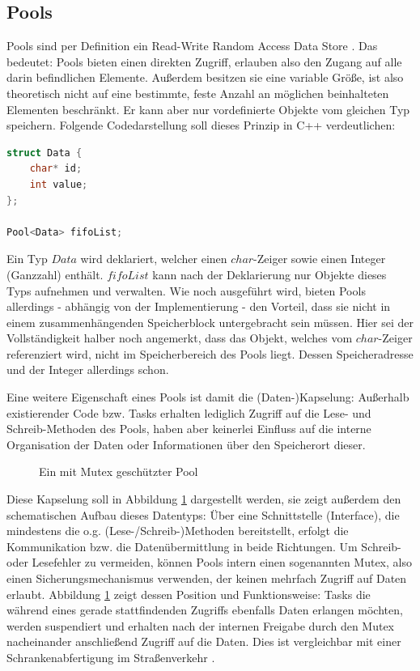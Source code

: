\documentclass{llncs}
\begin{document}
\subsection{Pools}
\label{subsec:Pools}
Pools sind per Definition ein \glqq Read-Write Random Access Data Store\grqq{} \autocite[94]{Cooling2017}. Das bedeutet: Pools bieten einen direkten Zugriff, erlauben also den Zugang auf alle darin befindlichen Elemente. Außerdem besitzen sie eine variable Größe, ist also theoretisch nicht auf eine bestimmte, feste Anzahl an möglichen beinhalteten Elementen beschränkt. Er kann aber nur vordefinierte Objekte vom gleichen Typ speichern. Folgende Codedarstellung soll dieses Prinzip in C++ verdeutlichen:
\begin{lstlisting}[language=C++]
struct Data {
	char* id;
	int value;
};

Pool<Data> fifoList;
\end{lstlisting}
Ein Typ $Data$ wird deklariert, welcher einen $char$-Zeiger sowie einen Integer (Ganzzahl) enthält. $fifoList$ kann nach der Deklarierung nur Objekte dieses Typs aufnehmen und verwalten. Wie noch ausgeführt wird, bieten Pools allerdings - abhängig von der Implementierung - den Vorteil, dass sie nicht in einem zusammenhängenden Speicherblock untergebracht sein müssen. Hier sei der Vollständigkeit halber noch angemerkt, dass das Objekt, welches vom $char$-Zeiger referenziert wird, nicht im Speicherbereich des Pools liegt. Dessen Speicheradresse und der Integer allerdings schon.

Eine weitere Eigenschaft eines Pools ist damit die (Daten-)Kapselung: Außerhalb existierender Code bzw. Tasks erhalten lediglich Zugriff auf die Lese- und Schreib-Methoden des Pools, haben aber keinerlei Einfluss auf die interne Organisation der Daten oder Informationen über den Speicherort dieser.\\

\begin{figure}%
	\centering
	\def\svgwidth{.50\columnwidth}

	
	\caption{\label{fig:Pool}Ein mit Mutex geschützter Pool \autocite[vgl.][95]{Cooling2017}}
\end{figure}

Diese Kapselung soll in Abbildung \ref{fig:Pool} dargestellt werden, sie zeigt außerdem den schematischen Aufbau dieses Datentyps: Über eine Schnittstelle (Interface), die mindestens die o.g. (Lese-/Schreib-)Methoden bereitstellt, erfolgt die Kommunikation bzw. die Datenübermittlung in beide Richtungen. Um Schreib- oder Lesefehler zu vermeiden, können Pools intern einen sogenannten Mutex, also einen Sicherungsmechanismus verwenden, der keinen mehrfach Zugriff auf Daten erlaubt. Abbildung \ref{fig:Pool} zeigt dessen Position und Funktionsweise: Tasks die während eines gerade stattfindenden Zugriffs ebenfalls Daten erlangen möchten, werden suspendiert und erhalten nach der internen Freigabe durch den Mutex nacheinander anschließend Zugriff auf die Daten. Dies ist vergleichbar mit einer Schrankenabfertigung im Straßenverkehr \autocite[vgl.][95]{Cooling2017}.\\
\end{document}
